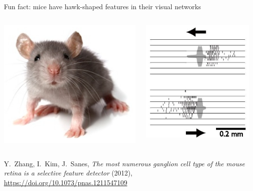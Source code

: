 \documentclass[aspectratio=169]{beamer}
\begin{document}
\begin{frame}{Fun fact: mice have hawk-shaped features in their visual networks}
\small
\vspace{0.5 cm}
\begin{columns}
\includegraphics[width=\linewidth]{mouse.png}

\includegraphics[width=\linewidth]{hawk-shaped-features.jpg}
\end{columns}

\vspace{0.75 cm}
Y.\ Zhang, I.\ Kim, J.\ Sanes, {\it The most numerous ganglion cell type of the mouse retina is a selective feature detector} (2012), \textcolor{blue}{\url{https://doi.org/10.1073/pnas.1211547109}}
\end{frame}
\end{document}
